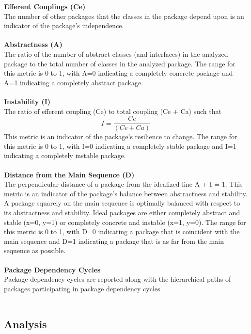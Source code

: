 \documentclass[12pt]{article}
\begin{document}
\textbf{Efferent Couplings (Ce)}\\
The number of other packages that the classes in the package depend upon is an indicator of the package's independence.\\ \\

\textbf{Abstractness (A)}\\
The ratio of the number of abstract classes (and interfaces) in the analyzed package to the total number of classes in the analyzed package. The range for this metric is 0 to 1, with A=0 indicating a completely concrete package and A=1 indicating a completely abstract package.\\ \\

\textbf{Instability (I)}\\
The ratio of efferent coupling (Ce) to total coupling (Ce + Ca) such that 
\begin{equation}
I = \frac{Ce}{(Ce + Ca)}
\end{equation}
This metric is an indicator of the package's resilience to change. The range for this metric is 0 to 1, with I=0 indicating a completely stable package and I=1 indicating a completely instable package.\\ \\

\textbf{Distance from the Main Sequence (D)}\\
The perpendicular distance of a package from the idealized line A + I = 1. This metric is an indicator of the package's balance between abstractness and stability. A package squarely on the main sequence is optimally balanced with respect to its abstractness and stability. Ideal packages are either completely abstract and stable (x=0, y=1) or completely concrete and instable (x=1, y=0). The range for this metric is 0 to 1, with D=0 indicating a package that is coincident with the main sequence and D=1 indicating a package that is as far from the main sequence as possible.\\ \\

\textbf{Package Dependency Cycles}\\
Package dependency cycles are reported along with the hierarchical paths of packages participating in package dependency cycles.\\ \\

\subsection{Analysis}
\end{document}
